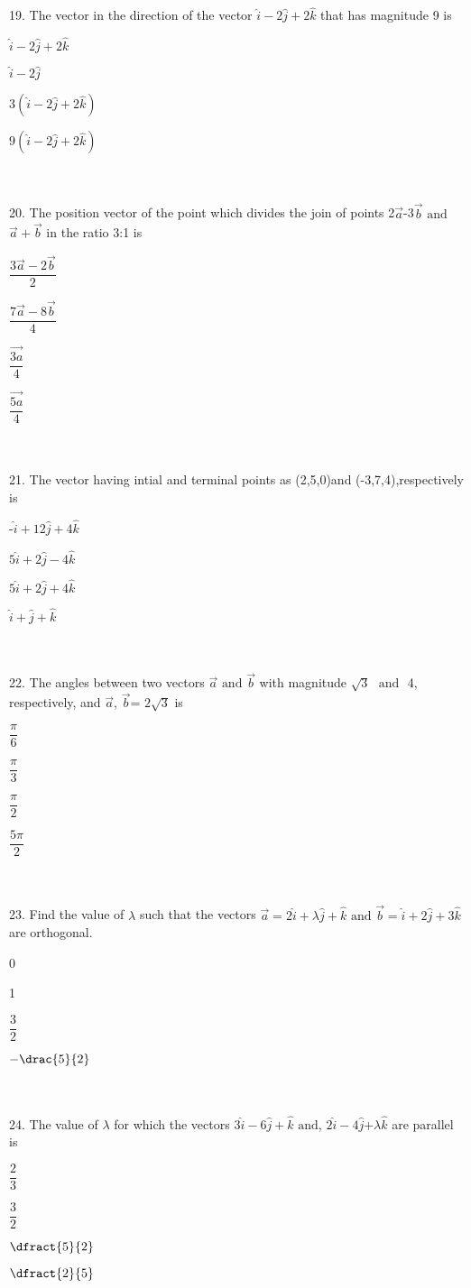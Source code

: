 \documentclass{article}
\newcommand{\choice}{\item}
\begin{document}
19. The vector in the direction of the vector $\hat{i}-2\hat{j}+2\hat{k}$ that has magnitude 9 is
\begin {choices}[twocol]
\choice $\hat{i}-2\hat{j}+2\hat{k}$
\choice $\hat{i}-2\hat{j}$
\choice $3(\hat{i}-2\hat{j}+2\hat{k})$
\choice $9(\hat{i}-2\hat{j}+2\hat{k})$
\end{choices}
\\
\\
20. The position vector of the point which divides the join of points 2$\vec{a}$-3$\vec{b}$ $\text{and}$ $\vec{a}+\vec{b}$ in the ratio 3:1 is
\begin {choices}[fourcol]
\choice $\dfrac{3\vec{a}-2\vec{b}}{2}$
\choice $\dfrac{7\vec{a}-8\vec{b}}{4}$
\choice $\dfrac{\vec{3a}}{4}$
\choice $\dfrac{\vec{5a}}{4}$
\end{choices}
\\
\\
21. The vector having intial and terminal points as (2,5,0)and (-3,7,4),respectively is
\begin {choices}[twocol]
\choice -$\hat{i}+12\hat{j}+4\hat{k}$
\choice $5\hat{i}+2\hat{j}-4\hat{k}$
\choice $5\hat{i}+2\hat{j}+4\hat{k}$
\choice $\hat{i}+\hat{j}+\hat{k}$
\end{choices}
\\
\\
22. The angles between two vectors $\vec{a}$ $\text{and}$ $\vec{b}$ with magnitude $\sqrt{3}$ $\text{ and }$ 4, respectively, and $\vec{a}$, $\vec{b}$= $2\sqrt{3}$ is
\begin {choices}[fourcol]
\choice $\dfrac{\pi}{6}$
\choice $\dfrac{\pi}{3}$
\choice $\dfrac{\pi}{2}$ 
\choice $\dfrac{5\pi}{2}$
\end{choices}
\\
\\
23. Find the value of $\lambda$ such that the vectors $\vec{a}=2\hat{i}+\lambda\hat{j}+\hat{k}$ $\text{and}$ $\vec{b}=\hat{i}+2\hat{j}+3\hat{k}$ are orthogonal.
\begin {choices}[fourcol]
\choice 0
\choice 1 
\choice $\dfrac{3}{2}$
\choice $-\drac{5}{2}$
\end{choices}
\\
\\
24. The value of $\lambda$ for which the vectors $3\hat{i}-6\hat{j}+\hat{k}$ $\text{and}$,  $2\hat{i}-4\hat{j}$+$\lambda\hat{k}$ are parallel is
\begin {choices}[fourcol]
\choice $\dfrac{2}{3}$
\choice $\dfrac{3}{2}$
\choice $\dfract{5}{2}$
\choice $\dfract{2}{5}$
\end{choices}	
\end{document}
